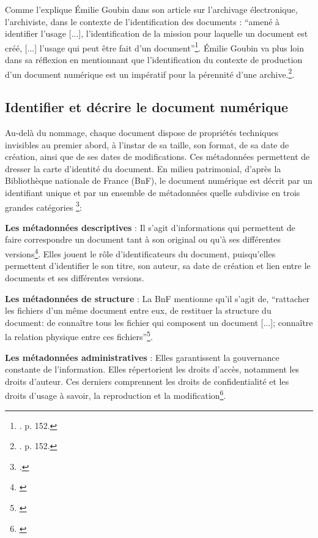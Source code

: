 Comme l’explique Émilie Goubin dans son article sur l'archivage électronique, l'archiviste, dans le contexte de l'identification des documents : \enquote{amené à identifier l'usage [...], l'identification de la mission pour laquelle un document est créé, [...]  l'usage qui peut être fait d'un document}\footnote{\cite{guyon-2023}. p. 152.}. Émilie Goubin va plus loin dans sa réflexion en mentionnant que l'identification du contexte de production d'un document numérique est un impératif pour la pérennité d'une archive.\footnote{\cite{guyon-2023}. p. 152.}. 

\subsection*{Identifier et décrire le document numérique}

Au-delà du nommage, chaque document dispose de propriétés techniques invisibles au premier abord, à l'instar de sa taille, son format, de sa date de création, ainsi que de ses dates de modifications. Ces métadonnées permettent de dresser la carte d'identité du document. En milieu patrimonial, d'après la Bibliothèque nationale de France (BnF), le document numérique est décrit par un identifiant unique et par un ensemble de métadonnées quelle subdivise en  trois grandes catégories \footnote{\cite{bnf-document-numerique-metadonnees}.}:


\textbf{Les métadonnées descriptives} : Il s'agit d'informations qui permettent de faire correspondre un document tant à son original ou qu'à ses différentes versions\footnote{\cite{bnf-document-numerique-metadonnees}}. Elles jouent le rôle d'identificateurs du document, puisqu’elles permettent d'identifier le son titre, son auteur, sa date de création et lien entre le documents et ses différentes versions.

\textbf{Les métadonnées de structure} : La BnF mentionne qu'il s'agit de, \enquote{rattacher les fichiers d'un même document entre eux, de restituer la structure du document: de connaître tous les fichier qui composent un document [...]; connaître la relation physique entre ces fichiers}\footnote{\cite{bnf-document-numerique-metadonnees}}.

\textbf{Les métadonnées administratives} : Elles garantissent la gouvernance constante de l'information. Elles répertorient les droits d'accès, notamment les droits d'auteur. Ces derniers comprennent les droits de confidentialité et les droits d'usage à savoir, la reproduction et la modification\footnote{\cite{bnf-document-numerique-metadonnees}}.
	
